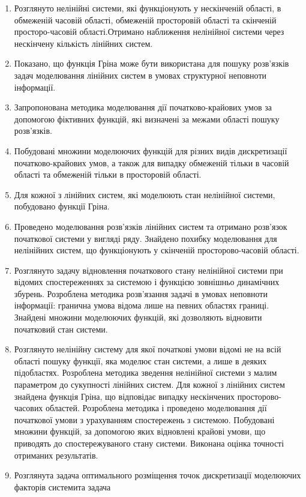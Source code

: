 \begin{enumerate}
  \item Розглянуто нелінійні системи, які функціонують у нескінченій області, в обмеженій часовій області, обмеженій
  просторовій області та скінченій просторо-часовій області.Отримано наближення нелінійної системи через нескінчену
  кількість лінійних систем.
  \item Показано, що функція Гріна може бути використана для пошуку розв’язків задач моделювання лінійних систем в
  умовах структурної неповноти інформації.
  \item Запропонована методика моделювання дії початково-крайових умов за допомогою фіктивних функцій, які визначені за
  межами області пошуку розв’язків.
  \item Побудовані множини моделюючих функцій для різних видів дискретизації початково-крайових умов, а також для
  випадку  обмеженій тільки в часовій області та обмеженій тільки в просторовій області.
  \item Для кожної з лінійних систем, які моделюють стан нелінійної системи,  побудовано функції Гріна.
  \item Проведено моделювання розв’язків лінійних систем та отримано розв’язок початкової системи у вигляді ряду.
  Знайдено похибку моделювання для нелінійних систем, що функціонують у скінченій просторово-часовій області.
  \item Розглянуто задачу відновлення початкового стану нелінійної системи при відомих спостереженнях за системою і
  функцією зовнішньо динамічних збурень. Розроблена методика розв’язання задачі в умовах неповноти інформації:
  гранична умова відома лише на певних областях границі. Знайдені множини моделюючих функцій, які дозволяють
  відновити початковий стан системи.
  \item Розглянуто нелінійну систему для якої початкові умови відомі не на всій області пошуку функції, яка моделює
  стан системи, а лише в деяких підобластях. Розроблена методика зведення нелінійної системи з малим параметром до
  сукупності лінійних систем. Для кожної з лінійних систем знайдена функція Гріна, що відповідає випадку нескінчених
  просторово-часових областей. Розроблена методика і проведено моделювання дії початкової умови з урахуванням
  спостережень з системою. Побудовані множини функцій, за допомогою яких відновлені крайові умови, що приводять до
  спостережуваного стану системи. Виконана оцінка точності отриманих результатів.
  \item Розглянута задача оптимального розміщення  точок дискретизації моделюючих факторів системита задача

\end{enumerate}

